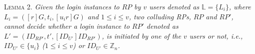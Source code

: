 
\vspace{1mm}



\noindent\textsc{Lemma 2.} {\em Given the login instances to $RP$ by $v$ users denoted as $\mathbb{L} = \{{L_i}\}$, where $L_i = ([r]G, t_i, [u_i r]G)$ and $1 \leq i \leq v$,
    two colluding RPs, $RP$ and $RP'$, cannot decide whether a login instance to $RP'$ denoted as $L' = (ID_{RP'}, t', [ID_{U'}]ID_{RP'})$, is initiated by one of the $v$ users or not, i.e., $ID_{U'} \in \{u_i\}$ ($1 \leq i \leq v$) or $ID_{U'} \in \mathbb{Z}_n$.}



